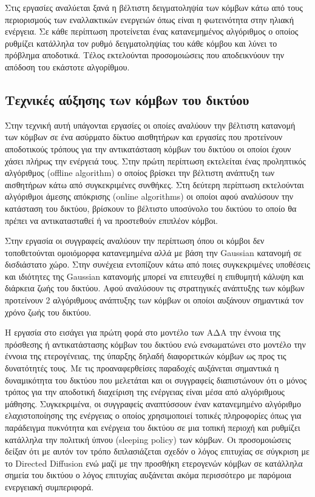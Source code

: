 Στις εργασίες \cite{harvesting_8} \cite{harvesting_9} αναλύεται ξανά η βέλτιστη δειγματοληψία των κόμβων κάτω από τους περιορισμούς των εναλλακτικών ενεργειών όπως
είναι η φωτεινότητα στην ηλιακή ενέργεια. Σε κάθε περίπτωση προτείνεται ένας κατανεμημένος αλγόριθμος ο οποίος ρυθμίζει κατάλληλα τον ρυθμό δειγματοληψίας του κάθε
κόμβου και λύνει το πρόβλημα αποδοτικά. Τέλος εκτελούνται προσομοιώσεις που αποδεικνύουν την απόδοση του εκάστοτε αλγορίθμου.



\subsection{Τεχνικές αύξησης των κόμβων του δικτύου}
Στην τεχνική αυτή υπάγονται εργασίες οι οποίες αναλύουν την βέλτιστη κατανομή των κόμβων σε ένα ασύρματο δίκτυο αισθητήρων και εργασίες που προτείνουν αποδοτικούς
τρόπους για την αντικατάσταση κόμβων του δικτύου οι οποίοι έχουν χάσει πλήρως την ενέργειά τους. Στην πρώτη περίπτωση εκτελείται ένας προληπτικός αλγόριθμος (offline
algorithm) ο οποίος βρίσκει την βέλτιστη ανάπτυξη των αισθητήρων κάτω από συγκεκριμένες συνθήκες. Στη δεύτερη περίπτωση εκτελούνται αλγόριθμοι άμεσης
απόκρισης (online algorithms) οι οποίοι αφού αναλύσουν την κατάσταση του δικτύου, βρίσκουν το βέλτιστο υποσύνολο του δικτύου το οποίο θα πρέπει να αντικατασταθεί ή
να προστεθούν επιπλέον κόμβοι.

Στην εργασία \cite{gaussian_sensors} οι συγγραφείς αναλύουν την περίπτωση όπου οι κόμβοι δεν τοποθετούνται ομοιόμορφα κατανεμημένα αλλά με βάση την Gaussian κατανομή
σε δισδιάστατο χώρο. Στην συνέχεια εντοπίζουν κάτω από ποιες συγκεκριμένες υποθέσεις και ιδιότητες της Gaussian κατανομής μπορεί να επιτευχθεί η επιθυμητή κάλυψη και
διάρκεια ζωής του δικτύου. Αφού αναλύσουν τις στρατηγικές ανάπτυξης των κόμβων προτείνουν 2 αλγόριθμους ανάπτυξης των κόμβων οι οποίοι αυξάνουν σημαντικά τον χρόνο
ζωής του δικτύου.

Η εργασία στο \cite{sens_deployment3} εισάγει για πρώτη φορά στο μοντέλο των ΑΔΑ την έννοια της πρόσθεσης ή αντικατάστασης κόμβων του δικτύου ενώ ενσωματώνει στο
μοντέλο την έννοια της ετερογένειας, της ύπαρξης δηλαδή διαφορετικών κόμβων ως προς τις δυνατότητές τους. Με τις προαναφερθείσες παραδοχές αυξάνεται σημαντικά η
δυναμικότητα του δικτύου που μελετάται και οι συγγραφείς διαπιστώνουν ότι ο μόνος τρόπος για την αποδοτική διαχείριση της ενέργειας είναι μέσα από αλγόριθμους
μάθησης. Συγκεκριμένα, οι συγγραφείς αναπτύσσουν έναν κατανεμημένο αλγόριθμο ελαχιστοποίησης της ενέργειας ο οποίος χρησιμοποιεί τοπικές πληροφορίες όπως για
παράδειγμα πυκνότητα και ενέργεια του δικτύου σε μια τοπική περιοχή και ρυθμίζει κατάλληλα την πολιτική ύπνου (sleeping policy) των κόμβων. Οι προσομοιώσεις δείξαν
ότι με αυτόν τον τρόπο διπλασιάζεται σχεδόν ο λόγος επιτυχίας σε σύγκριση με το Directed Diffusion ενώ μαζί με την προσθήκη ετερογενών κόμβων σε κατάλληλα σημεία του
δικτύου ο λόγος επιτυχίας αυξάνεται ακόμα περισσότερο με παρόμοια ενεργειακή συμπεριφορά.


